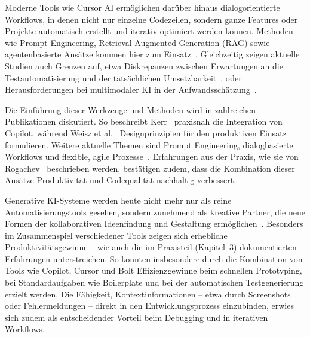 Moderne Tools wie Cursor AI ermöglichen darüber hinaus dialogorientierte
Workflows, in denen nicht nur einzelne Codezeilen, sondern ganze Features oder
Projekte automatisch erstellt und iterativ optimiert werden können. Methoden
wie Prompt Engineering, Retrieval-Augmented Generation (RAG) sowie
agentenbasierte Ansätze kommen hier zum
Einsatz~\cite{esposito_generative_2025}. Gleichzeitig zeigen aktuelle Studien
auch Grenzen auf, etwa Diskrepanzen zwischen Erwartungen an die
Testautomatisierung und der tatsächlichen
Umsetzbarkeit~\cite{karhu_expectations_2025}, oder Herausforderungen bei
multimodaler KI in der Aufwandsschätzung~\cite{islam_multimodal_2025}.

Die Einführung dieser Werkzeuge und Methoden wird in zahlreichen Publikationen
diskutiert. So beschreibt Kerr~\cite{kerr_github_nodate} praxisnah die
Integration von Copilot, während Weisz et al.~\cite{weisz_design_2024}
Designprinzipien für den produktiven Einsatz formulieren. Weitere aktuelle
Themen sind Prompt Engineering, dialogbasierte Workflows und flexible, agile
Prozesse~\cite{nguyen-duc_generative_2023,gill_agile_2025}. Erfahrungen aus der
Praxis, wie sie von Rogachev~\cite{rogachev_my_nodate} beschrieben werden,
bestätigen zudem, dass die Kombination dieser Ansätze Produktivität und
Codequalität nachhaltig verbessert.

Generative KI-Systeme werden heute nicht mehr nur als reine
Automatisierungstools gesehen, sondern zunehmend als kreative Partner, die neue
Formen der kollaborativen Ideenfindung und Gestaltung
ermöglichen~\cite{khan_beyond_2025}. Besonders im Zusammenspiel verschiedener
Tools zeigen sich erhebliche Produktivitätsgewinne – wie auch die im Praxisteil
(Kapitel~3) dokumentierten Erfahrungen unterstreichen. So konnten insbesondere
durch die Kombination von Tools wie Copilot, Cursor und Bolt Effizienzgewinne
beim schnellen Prototyping, bei Standardaufgaben wie Boilerplate und bei der
automatischen Testgenerierung erzielt werden. Die Fähigkeit,
Kontextinformationen – etwa durch Screenshots oder Fehlermeldungen – direkt in
den Entwicklungsprozess einzubinden, erwies sich zudem als entscheidender
Vorteil beim Debugging und in iterativen Workflows.

